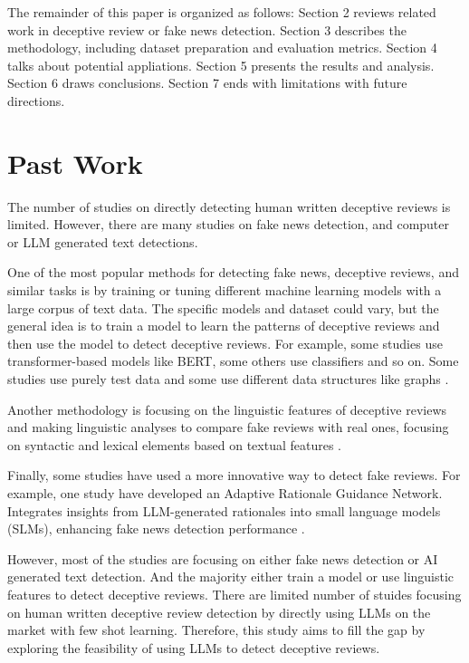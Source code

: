 \documentclass[sigconf, nonacm]{acmart}
\theoremstyle{definition}
\begin{document}
The remainder of this paper is organized as follows: Section 2 reviews related work in deceptive review or fake news detection. Section 3 describes the methodology, including dataset preparation and evaluation metrics. Section 4 talks about potential appliations. Section 5 presents the results and analysis. Section 6 draws conclusions. Section 7 ends with limitations with future directions.

\section{Past Work}
The number of studies on directly detecting human written deceptive reviews is limited. However, there are many studies on fake news detection, and computer or LLM generated text detections.

One of the most popular methods for detecting fake news, deceptive reviews, and similar tasks is by training or tuning different machine learning models with a large corpus of text data. The specific models and dataset could vary, but the general idea is to train a model to learn the patterns of deceptive reviews and then use the model to detect deceptive reviews. For example, some studies use transformer-based models like BERT, some others use classifiers and so on. Some studies use purely test data and some use different data structures like graphs \cite{liyanage-etal-2024-detecting, ott-etal-2011-finding, SALMINEN2022102771, ignat2024maideupmultilingualdeceptiondetection, 8259828}.

Another methodology is focusing on the linguistic features of deceptive reviews and making linguistic analyses to compare fake reviews with real ones, focusing on syntactic and lexical elements based on textual features \cite{ignat2024maideupmultilingualdeceptiondetection, 8259828, abri2020fakereviewsdetectionanalysis}.

Finally, some studies have used a more innovative way to detect fake reviews. For example, one study have developed an Adaptive Rationale Guidance Network. Integrates insights from LLM-generated rationales into small language models (SLMs), enhancing fake news detection performance \cite{Hu_2024}.

However, most of the studies are focusing on either fake news detection or AI generated text detection. And the majority either train a model or use linguistic features to detect deceptive reviews. There are limited number of stuides focusing on human written deceptive review detection by directly using LLMs on the market with few shot learning. Therefore, this study aims to fill the gap by exploring the feasibility of using LLMs to detect deceptive reviews.
\end{document}
